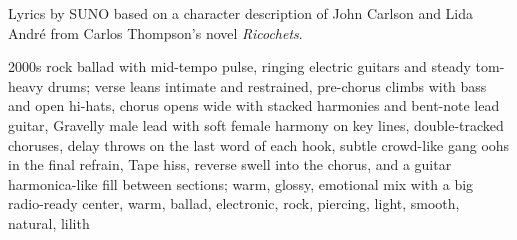 
\begin{notes}
Lyrics by SUNO based on a character description of John Carlson and Lida André %
from Carlos Thompson's novel \emph{Ricochets}.
\end{notes}
\begin{style}
2000s rock ballad with mid-tempo pulse, ringing electric guitars and steady tom-heavy drums; verse leans intimate and restrained, pre-chorus climbs with bass and open hi-hats, chorus opens wide with stacked harmonies and bent-note lead guitar, Gravelly male lead with soft female harmony on key lines, double-tracked choruses, delay throws on the last word of each hook, subtle crowd-like gang oohs in the final refrain, Tape hiss, reverse swell into the chorus, and a guitar harmonica-like fill between sections; warm, glossy, emotional mix with a big radio-ready center, warm, ballad, electronic, rock, piercing, light, smooth, natural, lilith
\end{style}
